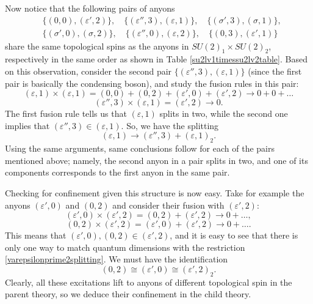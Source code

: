 \documentclass[11pt]{article}
\numberwithin{equation}{section}
\begin{document}
Now notice that the following pairs of anyons
\begin{align}
    &\{(0,0), (\varepsilon',2)\}, \quad \{(\varepsilon'',3), (\varepsilon,1)\}, \quad \{(\sigma', 3), (\sigma,1)\}, \nonumber \\[0.3cm] &\{(\sigma',0), (\sigma,2)\}, \quad \{(\varepsilon'',0), (\varepsilon,2)\}, \quad \{(0,3), (\varepsilon',1)\} \label{anyonlist}
\end{align}
share the same topological spins as the anyons in $SU(2)_{1} \times SU(2)_{2}$, respectively in the same order as shown in Table \ref{su2lv1timessu2lv2table}. Based on this observation, consider the second pair $\{(\varepsilon'',3), (\varepsilon,1)\}$ (since the first pair is basically the condensing boson), and study the fusion rules in this pair:
\begin{equation}
    (\varepsilon,1) \times (\varepsilon,1) = (0,0) + (0,2) + (\varepsilon',0) + (\varepsilon',2) \longrightarrow 0 + 0 + \ldots
\end{equation}
\begin{equation}
    (\varepsilon'',3) \times (\varepsilon,1) = (\varepsilon',2) \longrightarrow 0.
\end{equation}
The first fusion rule tells us that $(\varepsilon,1)$ splits in two, while the second one implies that $(\varepsilon'',3) \in (\varepsilon,1)$. So, we have the splitting
\begin{equation}
    (\varepsilon,1) \to (\varepsilon'',3) + (\varepsilon,1)_{2}.
\end{equation}
Using the same arguments, same conclusions follow for each of the pairs mentioned above; namely, the second anyon in a pair splits in two, and one of its components corresponds to the first anyon in the same pair.

Checking for confinement given this structure is now easy. Take for example the anyons $(\varepsilon',0)$ and $(0,2)$ and consider their fusion with $(\varepsilon',2)$:
\begin{equation}
    (\varepsilon',0) \times (\varepsilon',2) = (0,2) + (\varepsilon',2) \longrightarrow 0 + \ldots,
\end{equation}
\begin{equation}
    (0,2) \times (\varepsilon',2) = (\varepsilon',0) + (\varepsilon',2) \longrightarrow 0 + \ldots.
\end{equation}
This means that $(\varepsilon',0), (0,2) \in  (\varepsilon',2)$, and it is easy to see that there is only one way to match quantum dimensions with the restriction \eqref{varepsilonprime2splitting}. We must have the identification
\begin{equation}
    (0,2) \cong (\varepsilon',0) \cong (\varepsilon',2)_{2}.
\end{equation}
Clearly, all these excitations lift to anyons of different topological spin in the parent theory, so we deduce their confinement in the child theory.
\end{document}
